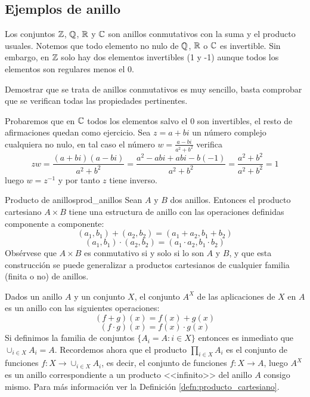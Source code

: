 \subsection{Ejemplos de anillo}
\begin{example}{}{}
    Los conjuntos $\mathbb{Z}$, $\mathbb{Q}$, $\mathbb{R}$ y $\mathbb{C}$ son anillos conmutativos con la suma y el producto usuales. Notemos que todo elemento no nulo de $\mathbb{Q}$, $\mathbb{R}$ o $\mathbb{C}$ es invertible. Sin embargo, en $\mathbb{Z}$ solo hay dos elementos invertibles (1 y -1) aunque todos los elementos son regulares menos el 0.
\end{example}

\begin{proofbox}
    Demostrar que se trata de anillos conmutativos es muy sencillo, basta comprobar que se verifican todas las propiedades pertinentes.
    
    Probaremos que en $\mathbb{C}$ todos los elementos salvo el 0 son invertibles, el resto de afirmaciones quedan como ejercicio. Sea $z = a + bi$ un número complejo cualquiera no nulo, en tal caso el número $w = \frac{a-bi}{a^2+b^2}$ verifica
    \[
    zw = \frac{(a+bi)(a-bi)}{a^2+b^2} = \frac{a^2 -abi +abi -b(-1)}{a^2+b^2} = \frac{a^2+b^2}{a^2+b^2} = 1
    \]
    luego $w = z^{-1}$ y por tanto $z$ tiene inverso.
\end{proofbox}

\begin{example}{Producto de anillos}{prod_anillos}
    Sean $A$ y $B$ dos anillos. Entonces el producto cartesiano $A \times B$ tiene una estructura de anillo con las operaciones definidas componente a componente:
    \[
    (a_1, b_1) + (a_2, b_2) = (a_1 + a_2, b_1 + b_2)
    \]
    \[
    (a_1, b_1) \cdot (a_2, b_2) = (a_1 \cdot a_2, b_1 \cdot b_2)
    \]
    Obsérvese que $A \times B$ es conmutativo si y solo si lo son $A$ y $B$, y que esta construcción se puede generalizar a productos cartesianos de cualquier familia (finita o no) de anillos.
\end{example}


\begin{example}{}{}
    Dados un anillo $A$ y un conjunto $X$, el conjunto $A^X$ de las aplicaciones de $X$ en $A$ es un anillo con las siguientes operaciones:
    \[
    (f + g)(x) = f(x) + g(x)
    \]
    \[
    (f \cdot g)(x) = f(x) \cdot g(x)
    \]
    Si definimos la familia de conjuntos $\{A_i = A : i \in X\}$ entonces es inmediato que $\cup_{i\in X} A_i = A$. Recordemos ahora que el producto $\prod_{i \in X} A_i$ es el conjunto de funciones $f: X \to \cup_{i\in X} A_i$, es decir, el conjunto de funciones $f : X \to A$, luego $A^X$ es un anillo correspondiente a un producto <<infinito>> del anillo $A$ consigo mismo. Para más información ver la Definición \ref{defn:producto_cartesiano}.
\end{example}

